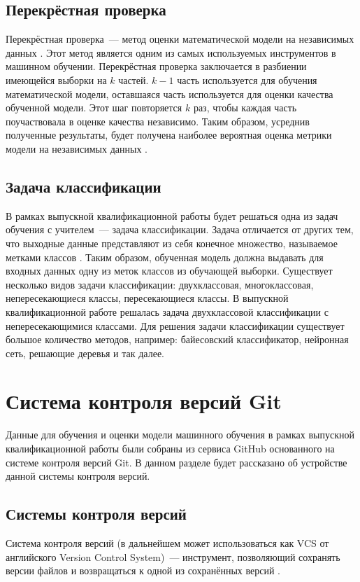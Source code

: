     \subsection{Перекрёстная проверка}
Перекрёстная проверка~--- метод оценки математической модели на независимых данных \cite{cross-validation-article}. Этот метод является одним из самых используемых инструментов в машинном обучении. Перекрёстная проверка заключается в разбиении имеющейся выборки на $k$ частей. $k - 1$ часть используется для обучения математической модели, оставшаяся часть используется для оценки качества обученной модели. Этот шаг повторяется $k$ раз, чтобы каждая часть поучаствовала в оценке качества независимо. Таким образом, усреднив полученные результаты, будет получена наиболее вероятная оценка метрики модели на независимых данных \cite{cross-validation-non-main}.
    \subsection{Задача классификации}
В рамках выпускной квалификационной работы будет решаться одна из задач обучения с учителем~--- задача классификации. Задача отличается от других тем, что выходные данные представляют из себя конечное множество, называемое метками классов \cite{classification-task}. Таким образом, обученная модель должна выдавать для входных данных одну из меток классов из обучающей выборки. Существует несколько видов задачи классификации: двухклассовая, многоклассовая, непересекающиеся классы, пересекающиеся классы. В выпускной квалификационной работе решалась задача двухклассовой классификации с непересекающимися классами. Для решения задачи классификации существует большое количество методов, например: байесовский классификатор, нейронная сеть, решающие деревья и так далее.
\section{Система контроля версий Git}
Данные для обучения и оценки модели машинного обучения в рамках выпускной квалификационной работы были собраны из сервиса GitHub основанного на системе контроля версий Git. В данном разделе будет рассказано об устройстве данной системы контроля версий.
    \subsection{Системы контроля версий}
Система контроля версий (в дальнейшем может использоваться как VCS от английского Version Control System)~--- инструмент, позволяющий сохранять версии файлов и возвращаться к одной из сохранённых версий \cite{vcs-definition}.

